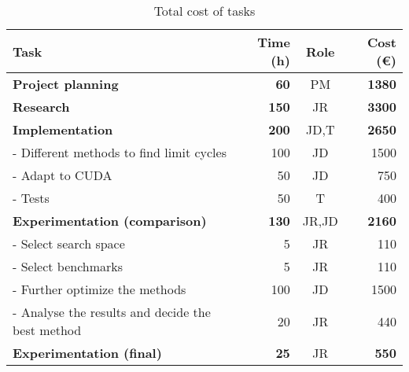 \begin{table}[H]
    \centering
    \caption{Total cost of tasks}\label{tab:cost}
    \begin{tabular}{lrcr}
        \toprule
        \textbf{Task} & \textbf{Time (h)} & \textbf{Role} & \textbf{Cost (€)} \\
        \midrule
    \textbf{Project planning} & \textbf{60} & PM & \textbf{1380} \\

        \addlinespace[0.5em]
        \textbf{Research} & \textbf{150} & JR & \textbf{3300}\\

        \addlinespace[0.5em]
        \textbf{Implementation} & \textbf{200} & JD,T & \textbf{2650} \\
        - Different methods to find limit cycles & 100 & JD & 1500 \\
        - Adapt to CUDA & 50 & JD & 750 \\
        - Tests & 50 & T & 400 \\

        \addlinespace[0.5em]
        \textbf{Experimentation (comparison)} & \textbf{130} & JR,JD & \textbf{2160} \\
        - Select search space & 5 & JR & 110 \\
        - Select benchmarks & 5 & JR & 110 \\
        - Further optimize the methods & 100 & JD & 1500 \\
        - Analyse the results and decide the best method & 20 & JR & 440 \\

    \addlinespace[0.5em]
        \textbf{Experimentation (final)} & \textbf{25} & JR & \textbf{550} \\


\end{tabular}
\end{table}
